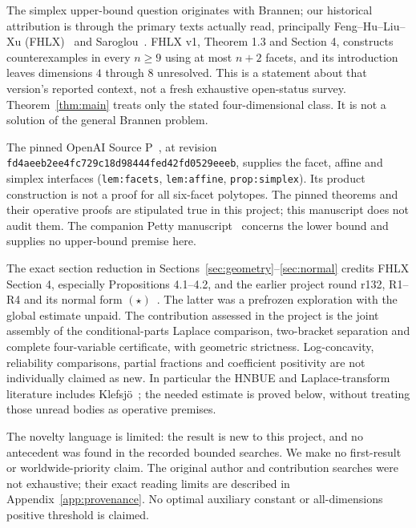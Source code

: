 \documentclass[11pt]{article}
\theoremstyle{remark}\newtheorem{remark}[theorem]{Remark}
\numberwithin{equation}{section}
\begin{document}
The simplex upper-bound question originates with Brannen; our historical
attribution is through the primary texts actually read, principally
Feng--Hu--Liu--Xu (FHLX)~\cite{FHLX} and Saroglou~\cite{Sar11,Sar15}.
FHLX v1, Theorem 1.3 and Section 4, constructs counterexamples in every
$n\ge9$ using at most $n+2$ facets, and its introduction leaves dimensions
$4$ through $8$ unresolved. This is a statement about that version's
reported context, not a fresh exhaustive open-status survey.
Theorem~\ref{thm:main} treats only the stated four-dimensional class.
It is not a solution of the general Brannen problem.

The pinned OpenAI Source P~\cite{SourceP}, at revision
\texttt{fd4aeeb2ee4fc729c18d98444fed42fd0529eeeb}, supplies the facet,
affine and simplex interfaces (\texttt{lem:facets}, \texttt{lem:affine},
\texttt{prop:simplex}). Its product construction is not a proof for all
six-facet polytopes. The pinned theorems and their operative proofs are
stipulated true in this project; this manuscript does not audit them.
The companion Petty manuscript~\cite{PettyComp} concerns the lower bound
and supplies no upper-bound premise here.

The exact section reduction in Sections~\ref{sec:geometry}--\ref{sec:normal}
credits FHLX Section 4, especially Propositions 4.1--4.2, and the earlier
project round r132, R1--R4 and its normal form $(\star)$~\cite{r132}.
The latter was a prefrozen exploration with the global estimate unpaid.
The contribution assessed in the project is the joint assembly of the
conditional-parts Laplace comparison, two-bracket separation and complete
four-variable certificate, with geometric strictness. Log-concavity,
reliability comparisons, partial fractions and coefficient positivity
are not individually claimed as new. In particular the HNBUE and
Laplace-transform literature includes Klefsj\"o~\cite{K82,K83}; the
needed estimate is proved below, without treating those unread bodies
as operative premises.

The novelty language is limited: the result is new to this project, and
no antecedent was found in the recorded bounded searches. We make no
first-result or worldwide-priority claim. The original author and
contribution searches were not exhaustive; their exact reading limits
are described in Appendix~\ref{app:provenance}. No optimal auxiliary
constant or all-dimensions positive threshold is claimed.
\end{document}

